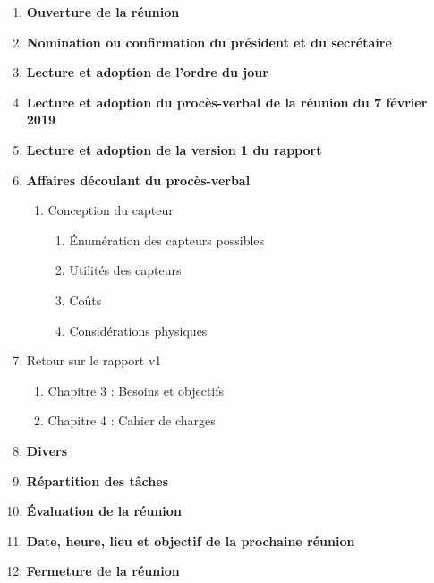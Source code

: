 \documentclass[12pt]{ULojpv}
\begin{document}
\entete
\begin{enumerate}
   \item \textbf{Ouverture de la r\'eunion}
   \item \textbf{Nomination ou confirmation du pr\'esident et du secr\'etaire}
   \item \textbf{Lecture et adoption de l'ordre du jour}
   \item \textbf{Lecture et adoption du proc\`es-verbal de la r\'eunion du 7 f\'evrier 2019}
   \item \textbf{Lecture et adoption de la version 1 du rapport}
   \item \textbf{Affaires d\'ecoulant du proc\`es-verbal}
      \begin{enumerate}
         \item Conception du capteur
            \begin{enumerate}
               \item \'Enum\'eration des capteurs possibles
               \item Utilit\'es des capteurs
               \item Co\^uts
               \item Consid\'erations physiques
            \end{enumerate}
      \end{enumerate}
   	\item Retour sur le rapport v1 
	\begin{enumerate}
		\item Chapitre 3 : Besoins et objectifs 
		\item Chapitre 4 : Cahier de charges
	\end{enumerate}
   \item \textbf{Divers}
   \item \textbf{R\'epartition des t\^aches}
   \item \textbf{\'Evaluation de la r\'eunion}
   \item \textbf{Date, heure, lieu et objectif de la prochaine r\'eunion}
   \item \textbf{Fermeture de la r\'eunion}
\end{enumerate}
\end{document}
